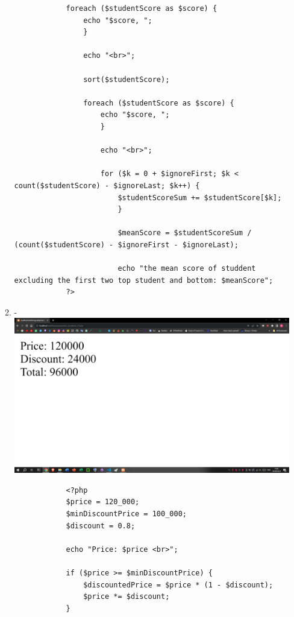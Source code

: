 \documentclass[12pt,titlepage]{article}
\begin{document}
\begin{enumerate}[label*=\arabic*.]
\begin{enumerate}[label*=\arabic*.]
\begin{verbatim}
            foreach ($studentScore as $score) {
                echo "$score, ";
                }
                
                echo "<br>";
                
                sort($studentScore);
                
                foreach ($studentScore as $score) {
                    echo "$score, ";
                    }
                    
                    echo "<br>";
                    
                    for ($k = 0 + $ignoreFirst; $k < count($studentScore) - $ignoreLast; $k++) { 
                        $studentScoreSum += $studentScore[$k];
                        }
            
                        $meanScore = $studentScoreSum / (count($studentScore) - $ignoreFirst - $ignoreLast);
                        
                        echo "the mean score of studdent excluding the first two top student and bottom: $meanScore";
            ?>
        \end{verbatim}
        \item - \\ \includegraphics[width=.8\textwidth]{images/figures/fig14.png}
        \begin{verbatim}
            <?php
            $price = 120_000;
            $minDiscountPrice = 100_000;
            $discount = 0.8;
            
            echo "Price: $price <br>";
            
            if ($price >= $minDiscountPrice) {
                $discountedPrice = $price * (1 - $discount);
                $price *= $discount;
            }
            

\end{verbatim}
\end{enumerate}
\end{enumerate}
\end{document}
